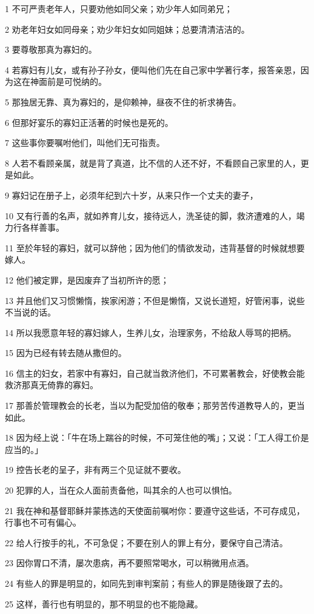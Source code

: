 \par 1 不可严责老年人，只要劝他如同父亲；劝少年人如同弟兄；
\par 2 劝老年妇女如同母亲；劝少年妇女如同姐妹；总要清清洁洁的。
\par 3 要尊敬那真为寡妇的。
\par 4 若寡妇有儿女，或有孙子孙女，便叫他们先在自己家中学著行孝，报答亲恩，因为这在神面前是可悦纳的。
\par 5 那独居无靠、真为寡妇的，是仰赖神，昼夜不住的祈求祷告。
\par 6 但那好宴乐的寡妇正活著的时候也是死的。
\par 7 这些事你要嘱咐他们，叫他们无可指责。
\par 8 人若不看顾亲属，就是背了真道，比不信的人还不好，不看顾自己家里的人，更是如此。
\par 9 寡妇记在册子上，必须年纪到六十岁，从来只作一个丈夫的妻子，
\par 10 又有行善的名声，就如养育儿女，接待远人，洗圣徒的脚，救济遭难的人，竭力行各样善事。
\par 11 至於年轻的寡妇，就可以辞他；因为他们的情欲发动，违背基督的时候就想要嫁人。
\par 12 他们被定罪，是因废弃了当初所许的愿；
\par 13 并且他们又习惯懒惰，挨家闲游；不但是懒惰，又说长道短，好管闲事，说些不当说的话。
\par 14 所以我愿意年轻的寡妇嫁人，生养儿女，治理家务，不给敌人辱骂的把柄。
\par 15 因为已经有转去随从撒但的。
\par 16 信主的妇女，若家中有寡妇，自己就当救济他们，不可累著教会，好使教会能救济那真无倚靠的寡妇。
\par 17 那善於管理教会的长老，当以为配受加倍的敬奉；那劳苦传道教导人的，更当如此。
\par 18 因为经上说：「牛在场上踹谷的时候，不可笼住他的嘴」；又说：「工人得工价是应当的。」
\par 19 控告长老的呈子，非有两三个见证就不要收。
\par 20 犯罪的人，当在众人面前责备他，叫其余的人也可以惧怕。
\par 21 我在神和基督耶稣并蒙拣选的天使面前嘱咐你：要遵守这些话，不可存成见，行事也不可有偏心。
\par 22 给人行按手的礼，不可急促；不要在别人的罪上有分，要保守自己清洁。
\par 23 因你胃口不清，屡次患病，再不要照常喝水，可以稍微用点酒。
\par 24 有些人的罪是明显的，如同先到审判案前；有些人的罪是随後跟了去的。
\par 25 这样，善行也有明显的，那不明显的也不能隐藏。

